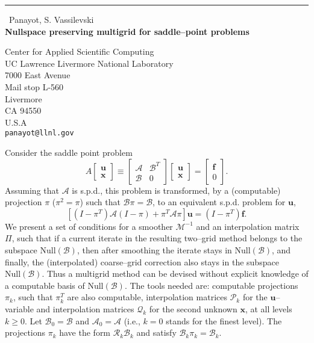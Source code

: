 \documentclass{report}
\begin{document}
\begin{center}
\rule{6in}{1pt} \
{\large Panayot, S. Vassilevski \\
{\bf Nullspace preserving multigrid for saddle--point problems}}

Center for Applied Scientific Computing \\ UC Lawrence Livermore National Laboratory \\ 7000 East Avenue \\ Mail stop L-560 \\ Livermore \\ CA 94550 \\ U.S.A
\\
{\tt panayot@llnl.gov}\end{center}

Consider the saddle point problem
$$
A \left [
\begin{array}{c}
{\mathbf u}\\
{\mathbf x}
\end{array} \right ] \equiv
\left [
\begin{array}{cc}
{\mathcal A} & {\mathcal B}^T\\
{\mathcal B} & 0
\end{array} \right ] \left [
\begin{array}{c}
{\mathbf u}\\
{\mathbf x}
\end{array} \right ] = \left [
\begin{array}{c}
{\mathbf f}\\
0
\end{array} \right ].
$$
Assuming that ${\mathcal A}$ is s.p.d.,
this problem is transformed, by a (computable) projection $\pi$ ($\pi^2
= \pi$)
such that
${\mathcal B}\pi = {\mathcal B}$,
to an equivalent
s.p.d. problem for ${\mathbf u}$,
$$
\left [
(I-\pi^T){\mathcal A}(I-\pi) + \pi^T {\mathcal A} \pi \right ]
{\mathbf u} = (I-\pi^T){\mathbf f}.
$$
We present a set of conditions for a smoother
${\mathcal M}^{-1}$ and an interpolation matrix $\Pi$, such that
if a current iterate in the resulting two--grid method
belongs to the subspace $\text{Null}({\mathcal B})$,
then after smoothing
the iterate stays
in $\text{Null}({\mathcal B})$,
and finally,
the (interpolated) coarse--grid correction also stays in the subspace
$\text{Null}({\mathcal B})$.
Thus a multigrid method can be devised without
explicit knowledge of a computable basis
of $\text{Null}({\mathcal B})$.
The tools needed are: computable projections $\pi_k$, such that
$\pi^T_k$ are also
computable, interpolation matrices ${\mathcal P}_k$ for the
${\mathbf u}$--variable and interpolation matrices ${\mathcal Q}_k$ for
the
second unknown ${\mathbf x}$, at all levels $k \ge 0$.
Let ${\mathcal B}_0 = {\mathcal B}$ and
${\mathcal A}_0 = {\mathcal A}$ (i.e., $k=0$ stands for the finest
level).
The projections $\pi_k$ have the form ${\mathcal R}_k{\mathcal B}_k$
and
satisfy ${\mathcal B}_k \pi_k ={\mathcal B}_k$.
\end{document}
